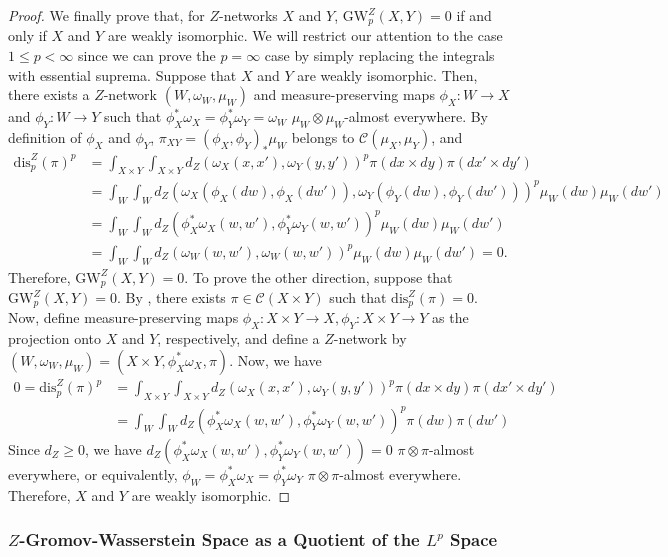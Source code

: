 \documentclass[twoside,11pt]{article}
\theoremstyle{definition}
\newcommand{\dgwz}{\mathrm{GW}_p^Z}
\newcommand{\disp}{\mathrm{dis}_p}
\begin{document}
\begin{proof}
    We finally prove that, for $Z$-networks $X$ and $Y$, $\dgwz(X,Y)=0$ if and only if $X$ and $Y$ are weakly isomorphic. We will restrict our attention to the case $1\leq p <\infty$ since we can prove the $p=\infty$ case by simply replacing the integrals with essential suprema. Suppose that $X$ and $Y$ are weakly isomorphic. Then, there exists a $Z$-network $(W,\omega_W, \mu_W)$ and measure-preserving maps $\phi_X:W\to X$ and $\phi_Y:W\to Y$ such that $\phi_X^*\omega_X = \phi_Y^* \omega_Y = \omega_W$ $\mu_W\otimes \mu_W$-almost everywhere. By definition of $\phi_X$ and $\phi_Y$,  $\pi_{XY}=(\phi_X, \phi_Y)_*\mu_W$ belongs to $\mathcal{C}(\mu_X,\mu_Y)$, and
    \begin{align}
        \disp^Z(\pi)^p & = \int_{X\times Y}\int_{X\times Y}d_Z(\omega_X(x,x'),\omega_Y(y,y'))^p\pi(dx\times dy)\pi(dx'\times dy') \\ &= \int_{W}\int_{W}d_Z(\omega_X(\phi_X(dw), \phi_X(dw')), \omega_Y(\phi_Y(dw),\phi_Y(dw')) )^p\mu_W(dw)\mu_W(dw') \\ &=\int_{W}\int_{W}d_Z(\phi_X^*\omega_X(w, w'), \phi_Y^*\omega_Y(w, w') )^p\mu_W(dw)\mu_W(dw') \\ &=\int_{W}\int_{W}d_Z(\omega_W(w,w'), \omega_W(w, w') )^p\mu_W(dw)\mu_W(dw')=0.
    \end{align}
    Therefore, $\dgwz (X,Y) = 0$. To prove the other direction, suppose that $\dgwz(X,Y)=0$. By , there exists $\pi \in \mathcal{C}(X\times Y)$ such that $\disp^Z(\pi)=0$. Now, define measure-preserving maps $\phi_X:X\times Y\to X, \phi_Y: X\times Y \to Y$ as the projection onto $X$ and $Y$, respectively, and define a $Z$-network by $(W,\omega_W,\mu_W)=(X\times Y, \phi_X^* \omega_X, \pi)$. Now, we have
    \begin{align}
        0=\disp^Z(\pi)^p & = \int_{X\times Y}\int_{X\times Y}d_Z(\omega_X(x,x'),\omega_Y(y,y'))^p\pi(dx\times dy)\pi(dx'\times dy') \\ &= \int_{W}\int_{W}d_Z(\phi_X^*\omega_X(w,w'),\phi_Y^*\omega_Y(w,w'))^p\pi(dw)\pi(dw')
    \end{align}
    Since $d_Z\geq 0$, we have $d_Z(\phi_X^*\omega_X(w,w'),\phi_Y^*\omega_Y(w,w'))=0$ $\pi\otimes \pi$-almost everywhere, or equivalently, $\phi_W = \phi_X^*\omega_X=\phi_Y^*\omega_Y$ $\pi\otimes \pi$-almost everywhere. Therefore, $X$ and $Y$ are weakly isomorphic.
\end{proof}



\subsubsection{\texorpdfstring{$Z$-Gromov-Wasserstein Space as a Quotient of the $L^p$ Space}{Z-Gromov-Wasserstein Space as a Quotient of the Lp Space}} 
\end{document}
